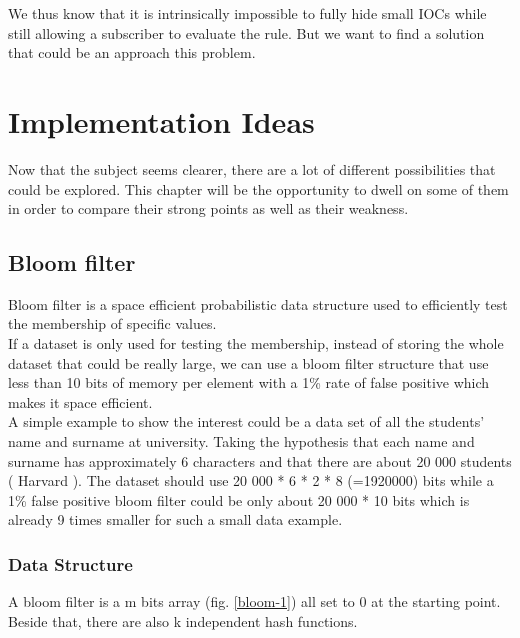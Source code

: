 \documentclass{eplmastersthesis}
\begin{document}
We thus know that it is intrinsically impossible to fully hide small IOCs while still allowing a subscriber to evaluate the rule. But we want to find a solution that could be an approach this problem.


\chapter{Implementation Ideas}

Now that the subject seems clearer, there are a lot of different possibilities that could be explored. This chapter will be the opportunity to dwell on some of them in order to compare their strong points as well as their weakness.

\section{Bloom filter}
Bloom filter is a space efficient probabilistic data structure  used to efficiently test the membership of specific values.\\
If a dataset is only used for testing the membership, instead of storing the whole dataset that could be really large, we can use a bloom filter structure that use less than 10 bits of memory per element with a 1\% rate of false positive which makes it space efficient.\\
A simple example to show the interest could be a data set of all the students' name and surname at university. Taking the hypothesis that each name and surname has approximately 6 characters and that there are about 20 000 students ( Harvard ). The dataset should use 20 000 * 6 * 2 * 8 (=1920000) bits while a 1\% false positive bloom filter could be only about 20 000 * 10 bits which is already 9 times smaller for such a small data example.\\

\subsection{Data Structure}
A bloom filter is a m bits array (fig. \ref{bloom-1}) all set to 0 at the starting point. Beside that, there are also k independent hash functions. 
\end{document}

